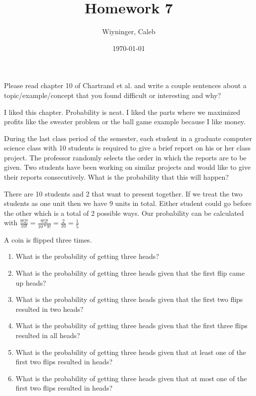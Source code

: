 \documentclass{homework}
\author{Wiyninger, Caleb}  %
\date{\today}  %
\title{Homework 7}
\begin{document}
 \maketitle

\question Please read chapter 10 of Chartrand et al. and write a couple sentences about a topic/example/concept that you found difficult or interesting and why?

\begin{sol}
  I liked this chapter. Probability is neat. I liked the parts where we maximized profits like the sweater problem or the ball game example because I like money.
\end{sol}

\question During the last class period of the semester, each student in a graduate computer science class with 10 students is required to give a brief report on his or her class project. The professor randomly selects the order in which the reports are to be given. Two students have been working on similar projects and would like to give their reports consecutively. What is the probability that this will happen?

\begin{sol}
  There are 10 students and 2 that want to present together. If we treat the two students as one unit then we have 9 units in total. Either student could go before the other which is a total of 2 possible ways. Our probability can be calculated with $\frac{9!2!}{10!} =  \frac{9!2!}{10*9!} = \frac{2}{10} = \frac{1}{5}$
\end{sol}

\question A coin is flipped three times.

\begin{enumerate}[label=(\alph*)]
	\item What is the probability of getting three heads?
	\item What is the probability of getting three heads given that the first flip came up heads?
	\item What is the probability of getting three heads given that the first two flips resulted in two heads?
	\item What is the probability of getting three heads given that the first three flips resulted in all heads?
	\item What is the probability of getting three heads given that at least one of the first two flips resulted in heads?
	\item What is the probability of getting three heads given that at most one of the first two flips resulted in heads?
\end{enumerate}
\end{document}
